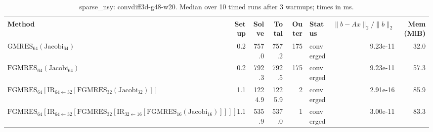 \begin{table}[t]
\centering
\small
\caption{sparse_nsy: convdiff3d-g48-w20. Median over 10 timed runs after 3 warmups; times in ms.}
\label{tab:sparse_nsy-convdiff3d-g48-w20}
\begin{tabular}{lrrrrlrr}
\hline
Method & Setup & Solve & Total & Outer & Status & $\|b-Ax\|_2/\|b\|_2$ & Mem (MiB) \\
\hline
$\mathrm{GMRES}_{64}(\mathrm{Jacobi}_{64})$ & 0.2 & 757.0 & 757.2 & 175 & converged & 9.23e-11 & 32.0 \\
$\mathrm{FGMRES}_{64}(\mathrm{Jacobi}_{64})$ & 0.2 & 792.3 & 792.5 & 175 & converged & 9.23e-11 & 57.3 \\
$\mathrm{FGMRES}_{64}[\mathrm{IR}_{64\leftarrow 32}[\mathrm{FGMRES}_{32}(\mathrm{Jacobi}_{32})]]$ & 1.1 & 1224.9 & 1225.9 & 2 & converged & 2.91e-16 & 85.9 \\
$\mathrm{FGMRES}_{64}[\mathrm{IR}_{64\leftarrow 32}[\mathrm{FGMRES}_{32}[\mathrm{IR}_{32\leftarrow 16}[\mathrm{FGMRES}_{16}(\mathrm{Jacobi}_{16})]]]]$ & 1.1 & 535.9 & 537.0 & 1 & converged & 3.00e-11 & 83.3 \\
\hline
\end{tabular}
\end{table}
